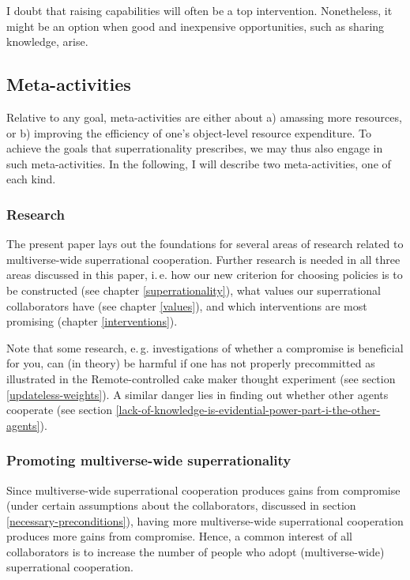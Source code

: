 I doubt that raising capabilities will often be a top intervention.
Nonetheless, it might be an option when good and inexpensive
opportunities, such as sharing knowledge, arise.

\hypertarget{meta-activities}{\subsection{Meta-activities}\label{meta-activities}}

Relative to any goal, meta-activities are either about a) amassing more
resources, or b) improving the efficiency of one's object-level resource
expenditure. To achieve the goals that superrationality prescribes, we
may thus also engage in such meta-activities. In the following, I will
describe two meta-activities, one of each kind.

\subsubsection{Research}\label{research}

The present paper lays out the foundations for several areas of research
related to multiverse-wide superrational cooperation. Further research
is needed in all three areas discussed in this paper, i.\,e. how our new
criterion for choosing policies is to be constructed (see chapter
\ref{superrationality}), what
values our superrational collaborators have (see chapter
\ref{values}), and which interventions
are most promising (chapter
\ref{interventions}).

Note that some research, e.\,g. investigations of whether a compromise is
beneficial for you, can (in theory) be harmful if one has not properly
precommitted as illustrated in the Remote-controlled cake maker thought
experiment (see section
\ref{updateless-weights}).
A similar danger lies in finding out whether other agents cooperate (see
section
\ref{lack-of-knowledge-is-evidential-power-part-i-the-other-agents}).

\subsubsection{Promoting multiverse-wide superrationality}
\label{promoting-multiverse-wide-superrationality}


Since multiverse-wide superrational cooperation produces gains from
compromise (under certain assumptions about the collaborators, discussed
in section \ref{necessary-preconditions}), having more multiverse-wide superrational
cooperation produces more gains from compromise. Hence, a common
interest of all collaborators is to increase the number of people who
adopt (multiverse-wide) superrational cooperation.

